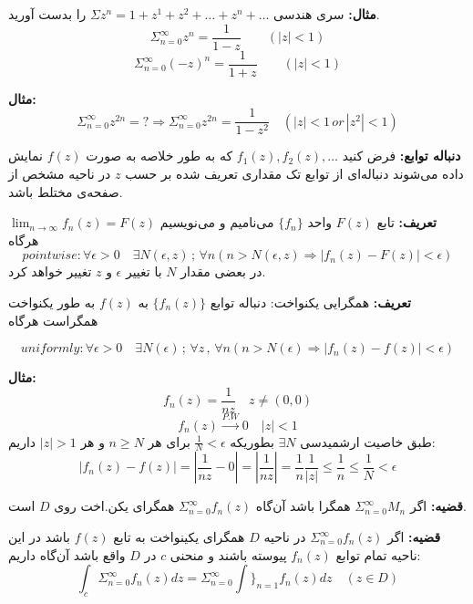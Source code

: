 \documentclass[12pt]{report}
\begin{document}
	\textbf{مثال:}
	سری هندسی 
	$\Sigma z^n = 1 + z^1 + z^2 + \dots + z^n + \dots$
	را بدست آورید.
	$$\Sigma_{n = 0}^{\infty} z^n = \frac{1}{1  -z} \qquad (|z| < 1)$$
	$$\Sigma_{n = 0}^{\infty} (-z)^n  = \frac{1}{1  +z} \qquad (|z| < 1)$$
	\newline
	
	\textbf{مثال:}
	$$\Sigma_{n = 0}^{\infty} z^{2n} = ? \Rightarrow \Sigma_{n = 0}^{\infty} z^{2n} = \frac{1}{1 - z^2} \quad (|z| < 1 \, or \, |z^2| < 1)$$
	\newline
	
	\textbf{دنباله توابع:}
	فرض کنید
	$f_1(z), f_2(z) , \dots$
	که به طور خلاصه به صورت
	$f(z)$
	نمایش داده می‌شوند دنباله‌ای از توابع تک مقداری تعریف شده بر حسب 
	$z$
	در ناحیه مشخص از صفحه‌ی مختلط باشد.
	\newline
	
	\textbf{تعریف:}
	تابع
	$F(z)$
	واحد
	$\{f_n\}$
	می‌نامیم و می‌نویسیم
	$\lim_{n \to \infty} f_n(z) = F(z)$
	هرگاه
	$$pointwise: \forall \epsilon > 0 \quad \exists N(\epsilon, z) \,;\, \forall n(n > N(\epsilon, z)\Rightarrow |f_n(z) - F(z)| < \epsilon)$$
	در بعضی مقدار 
	$N$
	با تغییر
	$\epsilon$
	و
	$z$
	تغییر خواهد کرد.
	\newline
	
	\textbf{تعریف:}
	همگرایی یکنواخت: دنباله توابع
	$\{f_n(z)\}$
	به 
	$f(z)$
	به طور یکنواخت همگراست هرگاه
	
	$$uniformly  : \forall \epsilon > 0 \quad \exists N(\epsilon) \, ;\, \forall z \,,\,\forall n (n > N(\epsilon) \Rightarrow |f_n(z) - f(z)| < \epsilon)$$
	\newline
	
	\textbf{مثال:}
	$$f_n(z) = \frac{1}{nz} \quad z \neq (0, 0)$$
	$$f_n(z) \overset{P.W}{\rightarrow} 0 \quad |z|<1$$
	طبق خاصیت ارشمیدسی
	$\exists N$
	بطوریکه
	$\frac{1}{N} < \epsilon$
	برای هر 
	$n \geq N$
	و هر
	$|z|> 1$
	داریم:
	$$|f_n(z) - f(z)| = |\frac{1}{nz} - 0| = |\frac{1}{nz}| = \frac{1}{n}\frac{1}{|z|} \leq \frac{1}{n} \leq \frac{1}{N} < \epsilon$$
	\newline
	
	\textbf{قضیه:}
	اگر
	$\Sigma_{n = 0}^{\infty}M_n$
	همگرا باشد آن‌گاه
	$\Sigma_{n = 0}^{\infty}f_n(z)$
	همگرای یکن.اخت روی
	$D$
	است.
	\newline
	
	\textbf{قضیه:}
	اگر
	$\Sigma_{n = 0}^{\infty}f_n(z)$
	در ناحیه 
	$D$
همگرای یکینواخت به تابع
$f(z)$
باشد در این ناحیه تمام توابع
$f_n(z)$
پیوسته باشند و منحنی 
$c$
در 
$D$
واقع باشد آن‌گاه داریم:
$$\int_{c} \Sigma_{n = 0}^{\infty}f_n(z) dz = \Sigma_{n = 0}^{\infty} \int\}_{n  = 1}  f_n(z) dz \quad (z \in D)$$
\newline
\end{document}
